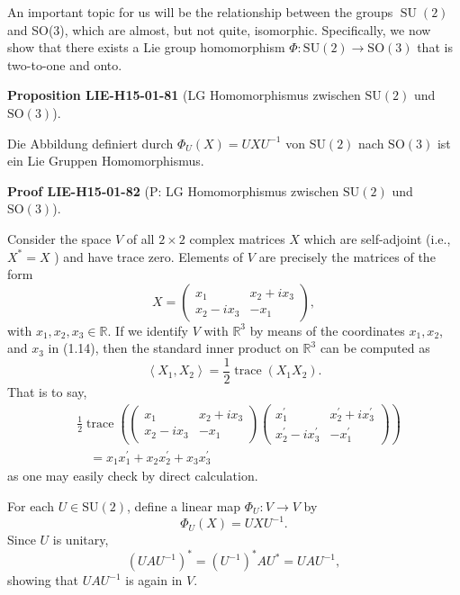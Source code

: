 \documentclass[10pt, letterpaper]{article}
\newcommand{\SO}{\mathrm{SO}}
\newcommand{\SU}{\mathrm{SU}}
\newcommand{\CustomHeading}[3]{%
  \par\medskip\noindent%
  \textbf{#1 #2} \textnormal{(#3)}.\enskip%
}
\newenvironment{PROP}[2]{\begin{unitbox}\CustomHeading{Proposition}{#1}{#2}}{\end{unitbox}}
\newenvironment{PROOF}[2]{\begin{unitbox}\CustomHeading{Proof}{#1}{#2}}{\end{unitbox}}
\begin{document}
An important topic for us will be the relationship between the groups $\operatorname{SU}(2)$ and SO(3), which are almost, but not quite, isomorphic. Specifically, we now show that there exists a Lie group homomorphism $\Phi: \mathrm{SU}(2) \rightarrow \mathrm{SO}(3)$ that is two-to-one and onto. 




\begin{PROP}{LIE-H15-01-81}{LG Homomorphismus zwischen $\SU(2)$ und $\SO(3)$}
Die Abbildung definiert durch $\Phi_{U}(X)=U X U^{-1}$ von $\SU(2)$ nach $\SO(3)$ ist ein Lie Gruppen Homomorphismus.
\end{PROP}

\begin{PROOF}{LIE-H15-01-82}{P: LG Homomorphismus zwischen $\SU(2)$ und $\SO(3)$}
Consider the space $V$ of all $2 \times 2$ complex matrices $X$ which are self-adjoint (i.e., $X^{*}=X$ ) and have trace zero. Elements of $V$ are precisely the matrices of the form
$$
X=\left(\begin{array}{cc}
x_{1} & x_{2}+i x_{3} \\
x_{2}-i x_{3} & -x_{1}
\end{array}\right),
$$
with $x_{1}, x_{2}, x_{3} \in \mathbb{R}$. If we identify $V$ with $\mathbb{R}^{3}$ by means of the coordinates $x_{1}, x_{2}$, and $x_{3}$ in (1.14), then the standard inner product on $\mathbb{R}^{3}$ can be computed as
$$
\left\langle X_{1}, X_{2}\right\rangle=\frac{1}{2} \operatorname{trace}\left(X_{1} X_{2}\right) .
$$
That is to say,
$$
\begin{aligned}
& \frac{1}{2} \operatorname{trace}\left(\left(\begin{array}{cc}
x_{1} & x_{2}+i x_{3} \\
x_{2}-i x_{3} & -x_{1}
\end{array}\right)\left(\begin{array}{cc}
x_{1}^{\prime} & x_{2}^{\prime}+i x_{3}^{\prime} \\
x_{2}^{\prime}-i x_{3}^{\prime} & -x_{1}^{\prime}
\end{array}\right)\right) \\
& \quad=x_{1} x_{1}^{\prime}+x_{2} x_{2}^{\prime}+x_{3} x_{3}^{\prime}
\end{aligned}
$$
as one may easily check by direct calculation.

For each $U \in \mathrm{SU}(2)$, define a linear map $\Phi_{U}: V \rightarrow V$ by
$$
\Phi_{U}(X)=U X U^{-1} .
$$
Since $U$ is unitary,
$$
\left(U A U^{-1}\right)^{*}=\left(U^{-1}\right)^{*} A U^{*}=U A U^{-1},
$$
showing that $U A U^{-1}$ is again in $V$.


\end{PROOF}
\end{document}
